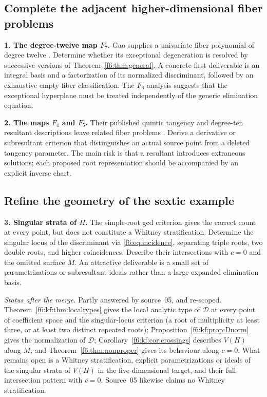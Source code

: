 \documentclass[11pt,a4paper]{article}
\theoremstyle{definition}
\newcommand{\dd}{\mathcal D}
\begin{document}
\subsection{Complete the adjacent higher-dimensional fiber problems}
\textbf{1. The degree-twelve map $F_7$.} Gao supplies a univariate
fiber polynomial of degree twelve \cite[\S4.6]{Gao}. Determine whether
its exceptional degeneration is resolved by successive versions of
Theorem~\ref{f6:thm:general}. A concrete first deliverable is an integral
basis and a factorization of its normalized discriminant, followed by
an exhaustive empty-fiber classification. The $F_6$ analysis suggests
that the exceptional hyperplane must be treated independently of the
generic elimination equation.

\textbf{2. The maps $F_4$ and $F_5$.} Their published quintic tangency
and degree-ten resultant descriptions leave related fiber problems
\cite[Appendix A.3]{Gao}. Derive a derivative or subresultant criterion
that distinguishes an actual source point from a deleted tangency
parameter. The main risk is that a resultant introduces extraneous
solutions; each proposed root representation should be accompanied by
an explicit inverse chart.

\subsection{Refine the geometry of the sextic example}
\textbf{3. Singular strata of $H$.} The simple-root gcd criterion gives
the correct count at every point, but does not constitute a Whitney
stratification. Determine the singular locus of the discriminant via
\eqref{f6:eq:incidence}, separating triple roots, two double roots, and
higher coincidences. Describe their intersections with $c=0$ and the
omitted surface $M$. An attractive deliverable is a small set of
parametrizations or subresultant ideals rather than a large expanded
elimination basis.

\emph{Status after the merge.} Partly answered by source~05, and re-scoped.
Theorem~\ref{f6:kf:thm:localtypes} gives the local analytic type of $\dd$ at
every point of coefficient space and the singular-locus criterion (a root of
multiplicity at least three, or at least two distinct repeated roots);
Proposition~\ref{f6:kf:prop:Dnorm} gives the normalization of $\dd$;
Corollary~\ref{f6:kf:cor:crossings} describes $V(H)$ along $M$; and
Theorem~\ref{f6:thm:nonproper} gives its behaviour along $c=0$. What remains
open is a Whitney stratification, explicit parametrizations or ideals of the
singular strata of $V(H)$ in the five-dimensional target, and their full
intersection pattern with $c=0$. Source~05 likewise claims no Whitney
stratification.
\end{document}
